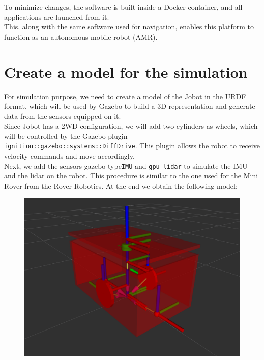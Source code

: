 To minimize changes, the software is built inside a Docker container, and all applications are launched from it.\\

This, along with the same software used for navigation, enables this platform to function as an autonomous mobile robot (AMR).\\


\newpage
\section{Create a model for the simulation}

For simulation purpose, we need to create a model  of the Jobot in the URDF format, which will be used by Gazebo to build a 3D representation and generate data from the sensors equipped on it.\\
Since Jobot has a 2WD configuration, we will add two cylinders as wheels, which will be controlled by the Gazebo plugin \texttt{ignition::gazebo::systems::DiffDrive}. This plugin allows the robot to receive velocity commands and move accordingly.\\
Next, we add the sensors gazebo type\texttt{IMU} and \texttt{gpu\_lidar} to simulate the IMU and the lidar on the robot. This procedure is similar to the one used for the Mini Rover from the Rover Robotics.
At the end we obtain the following model:

\begin{figure}[h]
	\centering
	\includegraphics[width=0.6\linewidth]{img/jobot_tf_strucure.png}
\end{figure}



